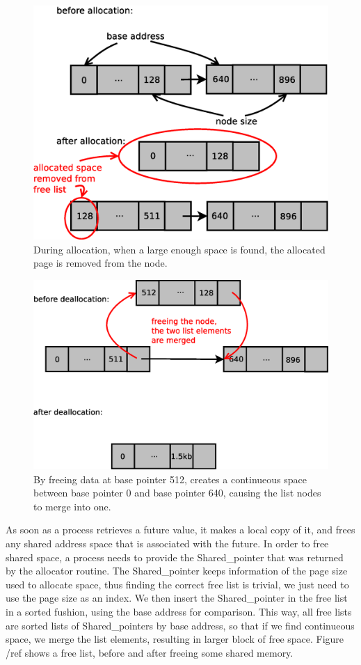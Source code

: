 \begin{figure}[here]
\includegraphics[width=0.6\columnwidth]{figures/alloc}
\caption{During allocation, when a large enough space is found, the allocated page is removed from the node.}
\label{fig:alloc}
\end{figure}

\begin{figure}[here]
\includegraphics[width=0.6\columnwidth]{figures/free}
\caption{By freeing data at base pointer 512, creates a continueous space between base pointer 0 and
base pointer 640, causing the list nodes to merge into one.}
\label{fig:free}
\end{figure}

As soon as a process retrieves a future value, it makes a local copy of it, and frees any shared address space
that is associated with the future.  In order to free shared space, a process needs to provide the Shared\_pointer
that was returned by the allocator routine.  The Shared\_pointer keeps information of the page size used to 
allocate space, thus finding the correct free list is trivial, we just need to use the page size as an index.
We then insert the Shared\_pointer in the free list in a sorted fushion, using the base address for comparison.
This way, all free lists are sorted lists of Shared\_pointers by base address, so that if we find continueous
space, we merge the list elements, resulting in larger block of free space.  Figure /ref shows a free list, before
and after freeing some shared memory.

